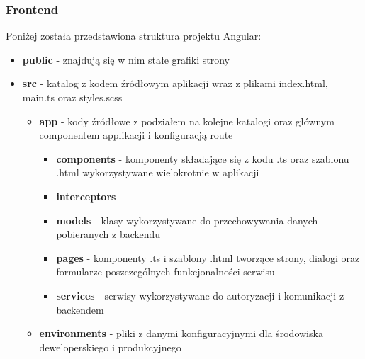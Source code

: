 \subsubsection{Frontend}
Poniżej została przedstawiona struktura projektu Angular:
\begin{itemize}
	\item \textbf{public} - znajdują się w nim stałe grafiki strony
	\item \textbf{src} - katalog z kodem źródłowym aplikacji wraz z plikami index.html, main.ts oraz styles.scss
		\begin{itemize}
			\item \textbf{app} - kody źródłowe z podziałem na kolejne katalogi oraz głównym componentem applikacji i konfiguracją route
				\begin{itemize}
					\item \textbf{components} - komponenty składające się z kodu .ts oraz szablonu .html wykorzystywane wielokrotnie w aplikacji
					\item \textbf{interceptors}
					\item \textbf{models} - klasy wykorzystywane do przechowywania danych pobieranych z backendu
					\item \textbf{pages} - komponenty .ts i szablony .html tworzące strony, dialogi oraz formularze poszczególnych funkcjonalności serwisu
					\item \textbf{services} - serwisy wykorzystywane do autoryzacji i komunikacji z backendem
				\end{itemize}
			\item \textbf{environments} - pliki z danymi konfiguracyjnymi dla środowiska deweloperskiego i produkcyjnego
		\end{itemize}
\end{itemize}

